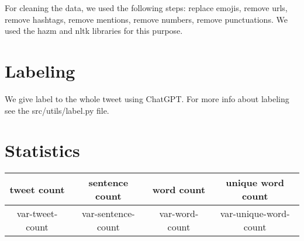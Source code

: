 \documentclass[12pt, letterpaper]{article}
\begin{document}
For cleaning the data, we used the following steps: replace emojis, remove urls, remove hashtags, remove mentions, remove numbers, remove punctuations. We used the hazm and nltk libraries for this purpose.

\section{Labeling}
We give label to the whole tweet using ChatGPT. For more info about labeling see the src\slash utils\slash label.py file.

\section{Statistics}
\begin{center}
\begin{tabular}{ |c|c|c|c| } 
    \hline
    tweet count & sentence count & word count & unique word count \\ 
    \hline
    var-tweet-count & var-sentence-count & var-word-count & var-unique-word-count \\
    \hline
\end{tabular}
\end{center}

\begin{center}
\end{center}
\end{document}
